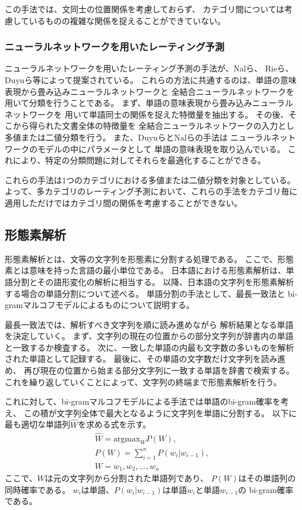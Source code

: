 この手法では、文同士の位置関係を考慮しておらず、
カテゴリ間については考慮しているものの複雑な関係を捉えることができていない。

\subsubsection{ニューラルネットワークを用いたレーティング予測}

ニューラルネットワークを用いたレーティング予測の手法が、Nalら\cite{nal14}、
Rieら\cite{rie14}、Duyuら\cite{duyu15}等によって提案されている。
これらの方法に共通するのは、単語の意味表現から畳み込みニューラルネットワークと
全結合ニューラルネットワークを用いて分類を行うことである。
まず、単語の意味表現から畳み込みニューラルネットワークを
用いて単語同士の関係を捉えた特徴量を抽出する。
その後、そこから得られた文書全体の特徴量を
全結合ニューラルネットワークの入力とし多値または二値分類を行う。
また、Duyuら\cite{duyu15}とNalら\cite{nal14}の手法は
ニューラルネットワークのモデルの中にパラメータとして
単語の意味表現を取り込んでいる。
これにより、特定の分類問題に対してそれらを最適化することができる。

これらの手法は1つのカテゴリにおける多値または二値分類を対象としている。
よって、多カテゴリのレーティング予測において、これらの手法をカテゴリ毎に
適用しただけではカテゴリ間の関係を考慮することができない。


\subsection{形態素解析}

形態素解析とは、文等の文字列を形態素に分割する処理である\cite{hozumi06}。
ここで、形態素とは意味を持った言語の最小単位である。
日本語における形態素解析は、単語分割とその語形変化の解析に相当する。
以降、日本語の文字列を形態素解析する場合の単語分割について述べる。
単語分割の手法として、最長一致法と
bi-gramマルコフモデルによるものについて説明する。

最長一致法では、解析すべき文字列を順に読み進めながら
解析結果となる単語を決定していく。
まず、文字列の現在の位置からの部分文字列が辞書内の単語と一致するか検査する。
次に、一致した単語の内最も文字数の多いものを解析された単語として記録する。
最後に、その単語の文字数だけ文字列を読み進め、
再び現在の位置から始まる部分文字列に一致する単語を辞書で検索する。
これを繰り返していくことによって、文字列の終端まで形態素解析を行う。

これに対して、bi-gramマルコフモデルによる手法では単語のbi-gram確率を考え、
この積が文字列全体で最大となるように文字列を単語に分割する。
以下に最も適切な単語列$\hat{W}$を求める式を示す。
\begin{gather}
  \hat{W} = \text{argmax}_{W} P(W), \\
  P(W) = \sum^{n}_{i = 1} P(w_i | w_{i - 1}), \nonumber \\
  W = w_1, w_2, ... , w_n \nonumber
\end{gather}
ここで、$W$は元の文字列から分割された単語列であり、
$P(W)$はその単語列の同時確率である。
$w_i$は単語、$P(w_i | w_{i - 1})$は単語$w_i$と単語$w_{i - 1}$の
bi-gram確率である。


